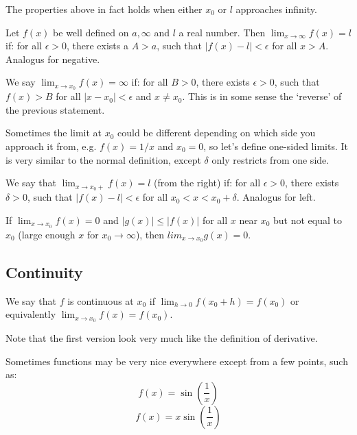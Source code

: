 \documentclass[11pt]{article}
\begin{document}
The properties above in fact holds when either \(x_0\) or \(l\) approaches infinity.
\begin{definition}[Epsilon-A]
  Let \(f(x)\) be well defined on \(a,\infty\) and \(l\) a real number. Then \(\lim_{x\to\infty}f(x)=l\) if: for all \(\epsilon>0\), there exists a \(A>a\), such that \(|f(x)-l|<\epsilon\) for all \(x>A\). Analogus for negative.
\end{definition}

\begin{definition}[B-Epsilon]
  We say \(\lim_{x\to x_0}f(x)=\infty\) if: for all \(B>0\), there exists \(\epsilon>0\), such that \(f(x)>B\) for all \(|x-x_0|<\epsilon\) and \(x\neq x_0\). This is in some sense the `reverse' of the previous statement.
\end{definition}

Sometimes the limit at \(x_0\) could be different depending on which side you approach it from, e.g. \(f(x)=1/x\) and \(x_0=0\), so let's define one-sided limits. It is very similar to the normal definition, except \(\delta\) only restricts from one side.

\begin{definition}
  We say that \(\lim_{x\to x_0 +}f(x)=l\) (from the right) if: for all \(\epsilon >0\), there exists \(\delta > 0\), such that \(|f(x)-l|<\epsilon\) for all \(x_0<x<x_0+\delta\). Analogus for left.
\end{definition}

\begin{proposition}
  If \(\lim_{x\to x_0}f(x)=0\) and \(|g(x)|\leq|f(x)|\) for all \(x\) near \(x_0\) but not equal to \(x_0\) (large enough \(x\) for \(x_0 \to \infty\)), then \(lim_{x\to x_0}g(x)=0\).
\end{proposition}

\subsection{Continuity}

\begin{definition}[Continuity]
  We say that \(f\) is continuous at \(x_0\) if \(\lim_{h\to 0}f(x_0+h)=f(x_0)\) or equivalently \(\lim_{x\to x_0}f(x)=f(x_0)\).
\end{definition}
Note that the first version look very much like the definition of derivative.  

Sometimes functions may be very nice everywhere except from a few points, such as:
\[f(x)=\sin \left(\frac{1}{x} \right)\]
\[f(x)=x\sin \left(\frac{1}{x} \right)\]
\end{document}
